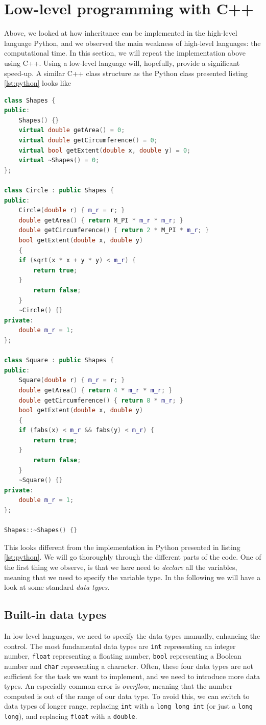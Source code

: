 \section{Low-level programming with C++}
Above, we looked at how inheritance can be implemented in the high-level language Python, and we observed the main weakness of high-level languages: the computational time. In this section, we will repeat the implementation above using C++. Using a low-level language will, hopefully, provide a significant speed-up. A similar C++ class structure as the Python class presented listing \ref{lst:python} looks like
\lstset{basicstyle=\scriptsize}
\begin{lstlisting}[language=c++, caption={Geometric shapes implemented in object-oriented C++.}, label={lst:cpp}]
class Shapes {
public:
	Shapes() {}
	virtual double getArea() = 0;
	virtual double getCircumference() = 0;
	virtual bool getExtent(double x, double y) = 0;
	virtual ~Shapes() = 0;
};

class Circle : public Shapes {
public:
	Circle(double r) { m_r = r; }
	double getArea() { return M_PI * m_r * m_r; }
	double getCircumference() { return 2 * M_PI * m_r; }
	bool getExtent(double x, double y)
	{
	if (sqrt(x * x + y * y) < m_r) {
		return true;
	}
		return false;
	}
	~Circle() {}
private:
	double m_r = 1;
};

class Square : public Shapes {
public:
	Square(double r) { m_r = r; }
	double getArea() { return 4 * m_r * m_r; }
	double getCircumference() { return 8 * m_r; }
	bool getExtent(double x, double y)
	{
	if (fabs(x) < m_r && fabs(y) < m_r) {
		return true;
	}
		return false;
	}
	~Square() {}
private:
	double m_r = 1;
};

Shapes::~Shapes() {}
\end{lstlisting}
This looks different from the implementation in Python presented in listing \eqref{lst:python}. We will go thoroughly through the different parts of the code. One of the first thing we observe, is that we here need to \textit{declare} all the variables, meaning that we need to specify the variable type. In the following we will have a look at some standard \textit{data types}.

\subsection{Built-in data types}
In low-level languages, we need to specify the data types manually, enhancing the control. The most fundamental data types are \texttt{int} representing an integer number, \texttt{float} representing a floating number, \texttt{bool} representing a Boolean number and \texttt{char} representing a character. Often, these four data types are not sufficient for the task we want to implement, and we need to introduce more data types. An especially common error is \textit{overflow}, meaning that the number computed is out of the range of our data type. To avoid this, we can switch to data types of longer range, replacing \texttt{int} with a \texttt{long long int} (or just a \texttt{long long}), and replacing \texttt{float} with a \texttt{double}.

